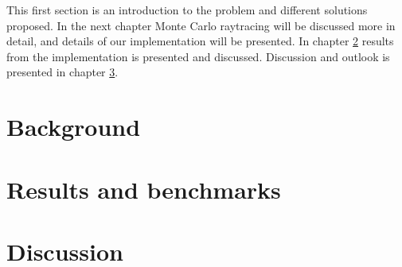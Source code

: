\documentclass[a4paper]{report}
\begin{document}
This first section is an introduction to the problem and different
solutions proposed. In the next chapter Monte Carlo raytracing will be
discussed more in detail, and details of our implementation will be
presented. In chapter \ref{ch:results} results from the implementation
is presented and discussed. Discussion and outlook is presented in chapter \ref{ch:discussion}. 

\chapter{Background}

\chapter{Results and benchmarks}
\label{ch:results}


\chapter{Discussion}
\label{ch:discussion}




\end{document}
